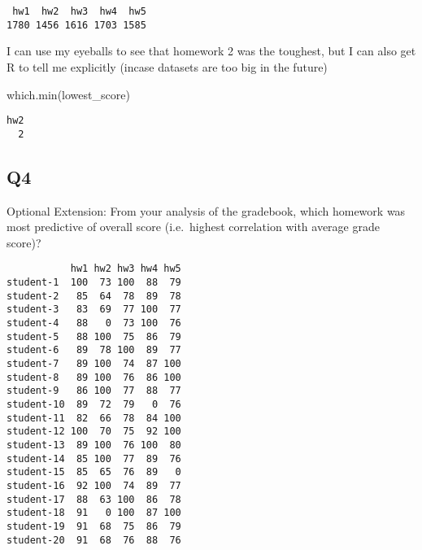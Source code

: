 \documentclass[
  letterpaper,
  DIV=11,
  numbers=noendperiod]{scrartcl}
\newenvironment{Shaded}{\begin{snugshade}}{\end{snugshade}}
\newcommand{\CommentTok}[1]{\textcolor[rgb]{0.37,0.37,0.37}{#1}}
\newcommand{\DecValTok}[1]{\textcolor[rgb]{0.68,0.00,0.00}{#1}}
\newcommand{\FunctionTok}[1]{\textcolor[rgb]{0.28,0.35,0.67}{#1}}
\newcommand{\NormalTok}[1]{\textcolor[rgb]{0.00,0.23,0.31}{#1}}
\newcommand{\OtherTok}[1]{\textcolor[rgb]{0.00,0.23,0.31}{#1}}
\begin{document}
\begin{verbatim}
 hw1  hw2  hw3  hw4  hw5 
1780 1456 1616 1703 1585 
\end{verbatim}

I can use my eyeballs to see that homework 2 was the toughest, but I can
also get R to tell me explicitly (incase datasets are too big in the
future)

\begin{Shaded}
\begin{Highlighting}[]
\FunctionTok{which.min}\NormalTok{(lowest\_score)}
\end{Highlighting}
\end{Shaded}

\begin{verbatim}
hw2 
  2 
\end{verbatim}

\hypertarget{q4}{%
\subsection{\texorpdfstring{\textbf{Q4}}{Q4}}\label{q4}}

Optional Extension: From your analysis of the gradebook, which homework
was most predictive of overall score (i.e.~highest correlation with
average grade score)?

\begin{Shaded}
\end{Shaded}

\begin{verbatim}
           hw1 hw2 hw3 hw4 hw5
student-1  100  73 100  88  79
student-2   85  64  78  89  78
student-3   83  69  77 100  77
student-4   88   0  73 100  76
student-5   88 100  75  86  79
student-6   89  78 100  89  77
student-7   89 100  74  87 100
student-8   89 100  76  86 100
student-9   86 100  77  88  77
student-10  89  72  79   0  76
student-11  82  66  78  84 100
student-12 100  70  75  92 100
student-13  89 100  76 100  80
student-14  85 100  77  89  76
student-15  85  65  76  89   0
student-16  92 100  74  89  77
student-17  88  63 100  86  78
student-18  91   0 100  87 100
student-19  91  68  75  86  79
student-20  91  68  76  88  76
\end{verbatim}
\end{document}
